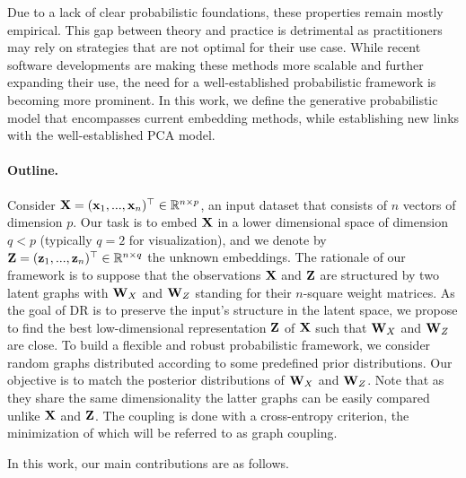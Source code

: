 Due to a lack of clear probabilistic foundations, these properties remain mostly empirical. This gap between theory and practice is detrimental as practitioners may rely on strategies that are not optimal for their use case.
While recent software developments are making these methods more scalable \cite{chan2018t,pezzotti2019gpgpu,linderman2019fast} and further expanding their use, the need for a well-established probabilistic framework is becoming more prominent.
In this work, we define the generative probabilistic model that encompasses current embedding methods, while establishing new links with the well-established PCA model.

\paragraph{Outline.} 
Consider $\mathbf{X} = (\mathbf{x}_1,..., \mathbf{x}_n)^\top \in \mathbb{R}^{n \times p}$, an input dataset that consists of $n$ vectors of dimension $p$. Our task is to embed $\mathbf{X}$ in a lower dimensional space of dimension $q<p$ (typically $q=2$ for visualization), and we denote by $\mathbf{Z} = (\mathbf{z}_1, ..., \mathbf{z}_n)^\top \in \mathbb{R}^{n \times q}$ the unknown embeddings. The rationale of our framework is to suppose that the observations $\mathbf{X}$ and $\mathbf{Z}$ are structured by two latent graphs with $\mathbf{W}_{X}$ and $\mathbf{W}_{Z}$ standing for their $n$-square weight matrices.
As the goal of DR is to preserve the input's structure in the latent space, we propose to find the best low-dimensional representation $\mathbf{Z}$ of $\mathbf{X}$ such that $\mathbf{W}_{X}$ and $\mathbf{W}_{Z}$ are close. To build a flexible and robust probabilistic framework, we consider random graphs distributed according to some predefined prior distributions. Our objective is to match the posterior distributions of $\mathbf{W}_{X}$ and $\mathbf{W}_{Z}$. Note that as they share the same dimensionality the latter graphs can be easily compared unlike $\mathbf{X}$ and $\mathbf{Z}$. The coupling is done with a cross-entropy criterion, the minimization of which will be referred to as graph coupling.

In this work, our main contributions are as follows.

